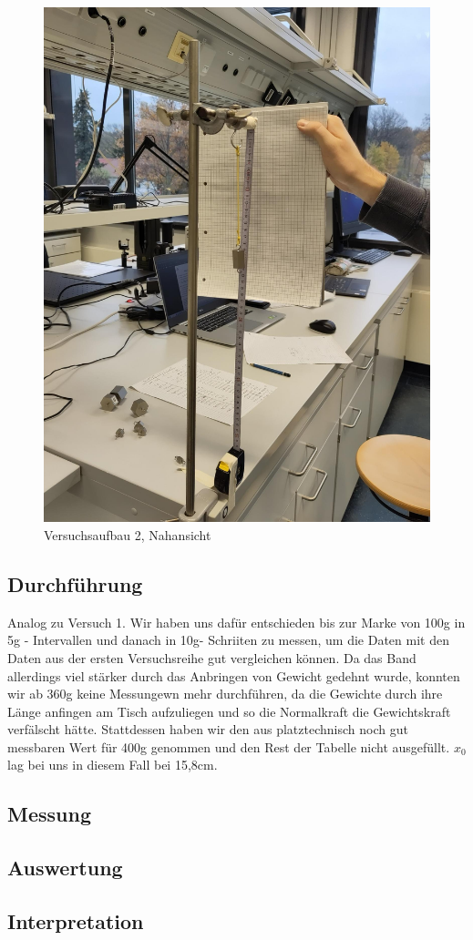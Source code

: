 \documentclass[
]{article}
\begin{document}
\begin{figure}
\centering
\includegraphics{Bilder/V2B2.jpeg}
\caption{Versuchsaufbau 2, Nahansicht}
\end{figure}

\hypertarget{durchfuxfchrung-1}{%
\subsection{Durchführung}\label{durchfuxfchrung-1}}

Analog zu Versuch 1. Wir haben uns dafür entschieden bis zur Marke von
100g in 5g - Intervallen und danach in 10g- Schriiten zu messen, um die
Daten mit den Daten aus der ersten Versuchsreihe gut vergleichen können.
Da das Band allerdings viel stärker durch das Anbringen von Gewicht
gedehnt wurde, konnten wir ab 360g keine Messungewn mehr durchführen, da
die Gewichte durch ihre Länge anfingen am Tisch aufzuliegen und so die
Normalkraft die Gewichtskraft verfälscht hätte. Stattdessen haben wir
den aus platztechnisch noch gut messbaren Wert für 400g genommen und den
Rest der Tabelle nicht ausgefüllt. \(x_0\) lag bei uns in diesem Fall
bei 15,8cm.

\hypertarget{messung-1}{%
\subsection{Messung}\label{messung-1}}

\hypertarget{auswertung}{%
\subsection{Auswertung}\label{auswertung}}

\hypertarget{interpretation-1}{%
\subsection{Interpretation}\label{interpretation-1}}
\end{document}
